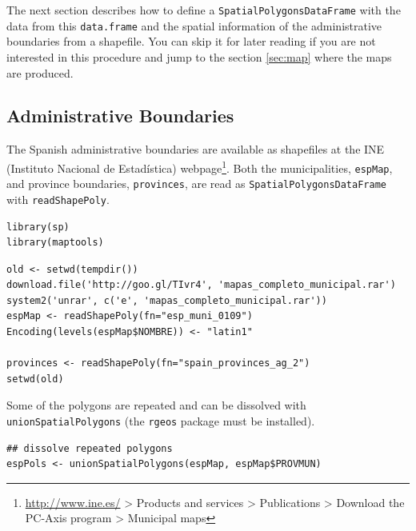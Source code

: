 \documentclass[smallroyalvopaper]{memoir}
\begin{document}
The next section describes how to define a \texttt{SpatialPolygonsDataFrame}
with the data from this \texttt{data.frame} and the spatial information of
the administrative boundaries from a shapefile. You can skip it for
later reading if you are not interested in this procedure and jump to
the section \ref{sec:map} where the maps are produced.

\subsection{\floweroneleft Administrative Boundaries}
\label{sec-1-1}

The Spanish administrative boundaries are available as shapefiles at
the INE (Instituto Nacional de Estadística) webpage\footnote{\url{http://www.ine.es/} > Products and services > Publications > Download the PC-Axis program > Municipal maps}. Both the
municipalities, \texttt{espMap}, and province boundaries, \texttt{provinces}, are
read as \texttt{SpatialPolygonsDataFrame} with \texttt{readShapePoly}.


\lstset{language=R,numbers=none}
\begin{lstlisting}
library(sp)
library(maptools)
\end{lstlisting}


\lstset{language=R,numbers=none}
\begin{lstlisting}
old <- setwd(tempdir())
download.file('http://goo.gl/TIvr4', 'mapas_completo_municipal.rar')
system2('unrar', c('e', 'mapas_completo_municipal.rar'))
espMap <- readShapePoly(fn="esp_muni_0109")
Encoding(levels(espMap$NOMBRE)) <- "latin1"

provinces <- readShapePoly(fn="spain_provinces_ag_2")
setwd(old)
\end{lstlisting}

Some of the polygons are repeated and can be dissolved with
\texttt{unionSpatialPolygons} (the \texttt{rgeos} package must be installed).
\lstset{language=R,numbers=none}
\begin{lstlisting}
## dissolve repeated polygons
espPols <- unionSpatialPolygons(espMap, espMap$PROVMUN)
\end{lstlisting}
\end{document}
